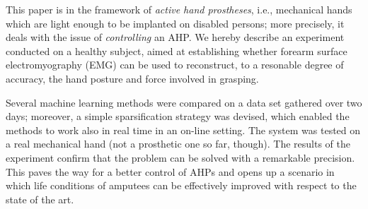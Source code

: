 This paper is in the framework of \emph{active hand prostheses}, i.e.,
mechanical hands which are light enough to be implanted on disabled
persons; more precisely, it deals with the issue of \emph{controlling}
an AHP. We hereby describe an experiment conducted on a healthy
subject, aimed at establishing whether forearm surface
electromyography (EMG) can be used to reconstruct, to a resonable
degree of accuracy, the hand posture and force involved in
grasping.

Several machine learning methods were compared on a data set gathered
over two days; moreover, a simple sparsification strategy was devised,
which enabled the methods to work also in real time in an on-line
setting. The system was tested on a real mechanical hand (not a
prosthetic one so far, though). The results of the experiment confirm
that the problem can be solved with a remarkable precision. This paves
the way for a better control of AHPs and opens up a scenario in which
life conditions of amputees can be effectively improved with respect
to the state of the art.
